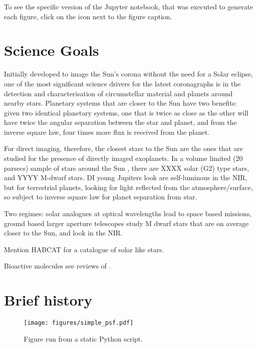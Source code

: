 \documentclass[letterpaper]{ar-1col}
\newcommand{\project}[1]{\textsf{#1}}
\begin{document}
To see the specific version of the \project{Jupyter} notebook, that was executed to generate each figure, click on the icon next to the figure caption.

\section{Science Goals}

Initially developed to image the Sun's corona without the need for a Solar eclipse, one of the most significant science drivers for the latest coronagraphs is in the detection and characterisation of circumstellar material and planets around nearby stars.
%
Planetary systems that are closer to the Sun have two benefits: given two identical planetary systems, one that is twice as close as the other will have twice the angular separation between the star and planet, and from the inverse square law, four times more flux is received from the planet.

For direct imaging, therefore, the closest stars to the Sun are the ones that are studied for the presence of directly imaged exoplanets.
%
In a volume limited (20 parsecs) sample of stars around the Sun \citep{2023arXiv231203639K}, there are XXXX solar (G2) type stars, and YYYY M-dwarf stars.
%
DI young Jupiters look are self-luminous in the NIR, but for terrestrial planets, looking for light reflected from the atmosphere/surface, so subject to inverse square law for planet separation from star.

Two regimes: solar analogues at optical wavelengths lead to space based missions, ground based larger aperture telescopes study M dwarf stars that are on average closer to the Sun, and look in the NIR.

Mention HABCAT for a catalogue of solar like stars.

Bioactive molecules see reviews of \citet{2016AsBio..16..465S,2017ARAA..55..433K,2018AsBio..18..663S}.


\section{Brief history}


\begin{figure}[ht]
  \centering
  \texttt{[image: figures/simple\_psf.pdf]}
  \caption{Figure run from a static Python script.}
  \label{fig:simplepsf}
\end{figure}
\end{document}
